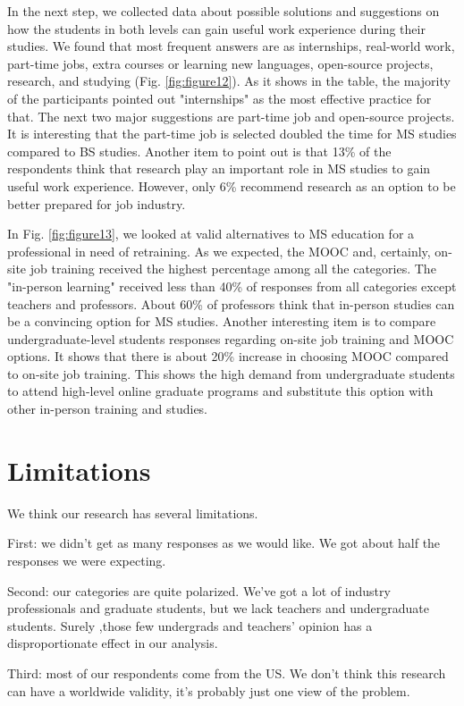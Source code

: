 \documentclass{sigchi}
\begin{document}
In the next step, we collected data about possible solutions and suggestions on how the students in both levels can gain useful work experience during their studies. We found that most frequent answers are as internships, real-world work, part-time jobs, extra courses or learning new languages, open-source projects, research, and studying (Fig. \ref{fig:figure12}). As it shows in the table, the majority of the participants pointed out "internships" as the most effective practice for that. The next two major suggestions are part-time job and open-source projects. It is interesting that the part-time job is selected doubled the time for MS studies compared to BS studies. Another item to point out is that 13\% of the respondents think that research play an important role in MS studies to gain useful work experience. However, only 6\% recommend research as an option to be better prepared for job industry.

In Fig. \ref{fig:figure13}, we looked at valid alternatives to MS education for a professional in need of retraining. As we expected, the MOOC and, certainly, on-site job training received the highest percentage among all the categories. The "in-person learning" received less than 40\% of responses from all categories except teachers and professors. About 60\% of professors think that in-person studies can be a convincing option for MS studies. Another interesting item is to compare undergraduate-level students responses regarding on-site job training and MOOC options. It shows that there is about 20\% increase in choosing MOOC compared to on-site job training. This shows the high demand from undergraduate students to attend high-level online graduate programs and substitute this option with other in-person training and studies.

\section{Limitations}
 We think our research has several limitations.

First: we didn't get as many responses as we would like. We got about half the responses we were expecting.

Second: our categories are quite polarized. We've got a lot of industry professionals and graduate students, but we lack teachers and undergraduate students. Surely ,those few undergrads and teachers' opinion has a disproportionate effect in our analysis.

Third: most of our respondents come from the US. We don't think this research can have a worldwide validity, it's probably just one view of the problem.
\end{document}
